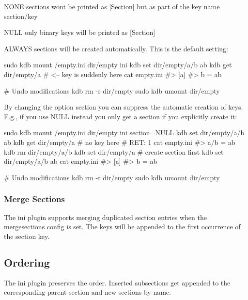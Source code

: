\begin{DoxyItemize}
\item {\ttfamily N\+O\+NE} sections wont be printed as {\ttfamily \mbox{[}Section\mbox{]}} but as part of the key name {\ttfamily section/key}
\item {\ttfamily N\+U\+LL} only binary keys will be printed as {\ttfamily \mbox{[}Section\mbox{]}}
\item {\ttfamily A\+L\+W\+A\+YS} sections will be created automatically. This is the default setting\+:
\end{DoxyItemize}


\begin{DoxyCode}
sudo kdb mount /empty.ini dir/empty ini
kdb set dir/empty/a/b ab
kdb get dir/empty/a       # <-- key is suddenly here
cat empty.ini
#> [a]
#> b = ab

# Undo modifications
kdb rm -r dir/empty
sudo kdb umount dir/empty
\end{DoxyCode}


By changing the option {\ttfamily section} you can suppress the automatic creation of keys. E.\+g., if you use {\ttfamily N\+U\+LL} instead you only get a section if you explicitly create it\+:


\begin{DoxyCode}
sudo kdb mount /empty.ini dir/empty ini section=NULL
kdb set dir/empty/a/b ab
kdb get dir/empty/a       # no key here
# RET: 1
cat empty.ini
#> a/b = ab
kdb rm dir/empty/a/b
kdb set dir/empty/a    # create section first
kdb set dir/empty/a/b ab
cat empty.ini
#> [a]
#> b = ab

# Undo modifications
kdb rm -r dir/empty
sudo kdb umount dir/empty
\end{DoxyCode}


\subsubsection*{Merge Sections}

The ini plugin supports merging duplicated section entries when the {\ttfamily mergesections} config is set. The keys will be appended to the first occurrence of the section key.

\subsection*{Ordering}

The ini plugin preserves the order. Inserted subsections get appended to the corresponding parent section and new sections by name.

